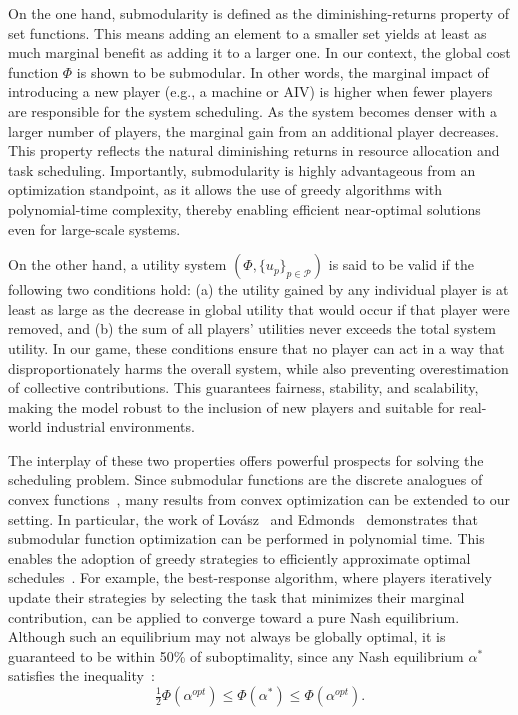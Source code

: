 \documentclass[preprint, 3p, review, 12pt]{elsarticle}
\begin{document}
On the one hand, submodularity is defined as the diminishing-returns property of set functions. This means adding an element to a smaller set yields at least as much marginal benefit as adding it to a larger one. In our context, the global cost function $\Phi$ is shown to be submodular. In other words, the marginal impact of introducing a new player (e.g., a machine or AIV) is higher when fewer players are responsible for the system scheduling. As the system becomes denser with a larger number of players, the marginal gain from an additional player decreases. This property reflects the natural diminishing returns in resource allocation and task scheduling. Importantly, submodularity is highly advantageous from an optimization standpoint, as it allows the use of greedy algorithms with polynomial-time complexity, thereby enabling efficient near-optimal solutions even for large-scale systems.

On the other hand, a utility system $(\Phi, \{u_p\}_{p \in \mathcal{P}})$ is said to be valid if the following two conditions hold: (a) the utility gained by any individual player is at least as large as the decrease in global utility that would occur if that player were removed, and (b) the sum of all players’ utilities never exceeds the total system utility. In our game, these conditions ensure that no player can act in a way that disproportionately harms the overall system, while also preventing overestimation of collective contributions. This guarantees fairness, stability, and scalability, making the model robust to the inclusion of new players and suitable for real-world industrial environments.

The interplay of these two properties offers powerful prospects for solving the scheduling problem. Since submodular functions are the discrete analogues of convex functions~\cite{9241495, schrijver2003}, many results from convex optimization can be extended to our setting. In particular, the work of Lovász~\cite{lovasz1983} and Edmonds~\cite{Edmonds2003} demonstrates that submodular function optimization can be performed in polynomial time. This enables the adoption of greedy strategies to efficiently approximate optimal schedules~\cite{1181966}. For example, the best-response algorithm, where players iteratively update their strategies by selecting the task that minimizes their marginal contribution, can be applied to converge toward a pure Nash equilibrium. Although such an equilibrium may not always be globally optimal, it is guaranteed to be within 50\% of suboptimality, since any Nash equilibrium $\alpha^*$ satisfies the inequality~\cite{1181966}:  
\begin{equation}
    \tfrac{1}{2}\Phi(\alpha^{opt}) \leq \Phi(\alpha^{*}) \leq \Phi(\alpha^{opt}).
\end{equation}
\end{document}

